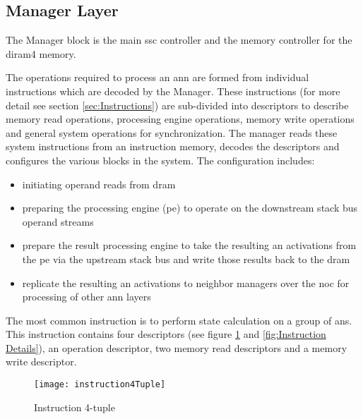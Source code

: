 \subsection{Manager Layer}
The Manager block is the main \ac{ssc} controller and the memory controller for the \ac{diram4} memory. 

The operations required to process an \ac{ann} are formed from individual instructions which are decoded by the Manager. 
These instructions (for more detail see section \ref{sec:Instructions}) are sub-divided into descriptors to describe memory read operations, processing engine operations, memory write operations and general system operations for synchronization. 
The manager reads these system instructions from an instruction memory, decodes the descriptors and configures the various blocks in the system.
The configuration includes:
\begin{itemize}
      \item initiating operand reads from \ac{dram}
      \item preparing the processing engine (\ac{pe}) to operate on the downstream stack bus operand streams
      \item prepare the result processing engine to take the resulting \ac{an} activations from the \ac{pe} via the upstream stack bus and write those results back to the \ac{dram}
      \item replicate the resulting \ac{an} activations to neighbor managers over the \ac{noc} for processing of other \ac{ann} layers
\end{itemize}

The most common instruction is to perform state calculation on a group of \acp{an}.
This instruction contains four descriptors (see figure \ref{fig:Instruction 4-tuple} and \ref{fig:Instruction Details}), an operation descriptor, two memory read descriptors and a memory write descriptor.
\begin{figure}[!t]
\centering
\captionsetup{justification=centering}
\captionsetup{width=.9\linewidth}
\centerline{
\mbox{\texttt{[image: instruction4Tuple]}}
}
\caption{Instruction 4-tuple}
\label{fig:Instruction 4-tuple}
\end{figure}


